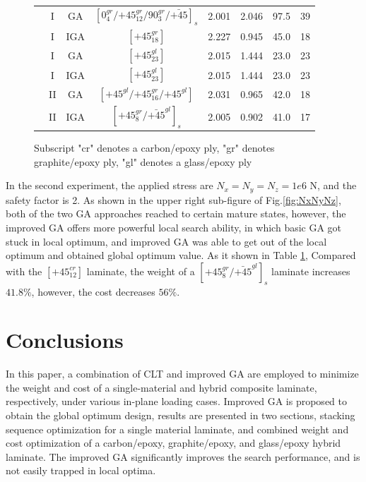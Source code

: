 \documentclass[Afour,sageh,times]{sagej}
\begin{document}
\begin{figure}
\begin{center}
\begin{tabular}{cccccccc}
																				 &  I  & GA   &  $[0_4^{gr}/\text{+}45_{12}^{gr}/90_3^{gr}/\bar{\text{+}45}]_s$                            & 2.001           & 2.046 &  97.5  & 39  \\
																				 &  I  & IGA  &  $[\text{+}45_{18}^{gr}]$                            & 2.227           & 0.945 &  45.0  & 18  \\
																				 &  I  & GA   &  $[\text{+}45_{23}^{gl}]$                            & 2.015           & 1.444 &  23.0  & 23  \\
																				 &  I  & IGA  &  $[\text{+}45_{23}^{gl}]$                            & 2.015           & 1.444 &  23.0  & 23  \\
																				 &  II &  GA  &  $[\text{+}45^{gl}/\text{+}45_{16}^{gr}/\text{+}45^{gl}]$          & 2.031           & 0.965 &  42.0  & 18 \\
																				 &  II & IGA  &  $[\text{+}45_8^{gr}/\bar{\text{+}45}^{gl}]_s$          & 2.005           & 0.902 &  41.0  & 17 \\
	\bottomrule
\end{tabular}
\label{tab:NxNyNz}
\begin{tablenotes}\footnotesize
     Subscript "cr" denotes a carbon/epoxy ply, "gr" denotes graphite/epoxy ply, "gl" denotes a
	glass/epoxy ply
\end{tablenotes}
\end{center}
\end{figure}

In the second experiment, the applied stress are $N_x=N_y=N_z = 1e6$ N, and the
safety factor is 2.  As shown in the upper right sub-figure of
Fig.\ref{fig:NxNyNz}, both of the two GA approaches reached to certain mature
states, however, the improved GA offers more powerful local search ability, in
which basic GA got stuck in local optimum, and improved GA was able to get out
of the local optimum and obtained global optimum value. As it shown in Table
\ref{tab:NxNyNz}, Compared with the $[\text{+}45_{12}^{cr}]$ laminate, the
weight of a $[\text{+}45_8^{gr}/\bar{\text{+}45}^{gl}]_s$ laminate increases
$41.8\%$, however, the cost decreases $56\%$.

\section{Conclusions}
In this paper, a combination of CLT and improved GA are employed to minimize
the weight and cost of a single-material and hybrid composite laminate,
respectively, under various in-plane loading cases. Improved GA is proposed to
obtain the global optimum design, results are presented in two sections,
stacking sequence optimization for a single material laminate, and combined
weight and cost optimization of a carbon/epoxy, graphite/epoxy, and glass/epoxy
hybrid laminate. The improved GA significantly improves the search performance,
and is not easily trapped in local optima.
\end{document}
